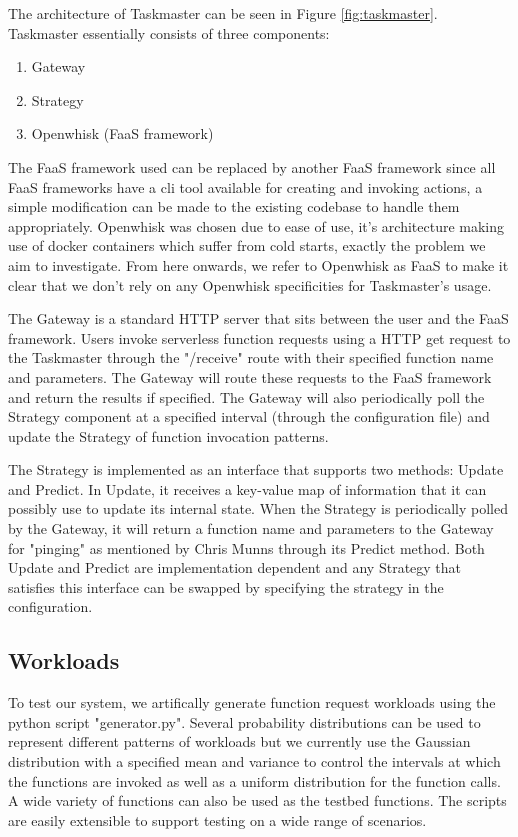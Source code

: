 \documentclass{article}
\begin{document}
The architecture of Taskmaster can be seen in Figure \ref{fig:taskmaster}. Taskmaster essentially consists of three components: 
\begin{enumerate}
    \item Gateway
    \item Strategy
    \item Openwhisk (FaaS framework)
\end{enumerate}

The FaaS framework used can be replaced by another FaaS framework since all FaaS frameworks have a cli tool available for creating and invoking actions, a simple modification can be made to the existing codebase to handle them appropriately. Openwhisk was chosen due to ease of use, it's architecture making use of docker containers which suffer from cold starts, exactly the problem we aim to investigate. From here onwards, we refer to Openwhisk as FaaS to make it clear that we don't rely on any Openwhisk specificities for Taskmaster's usage.

The Gateway is a standard HTTP server that sits between the user and the FaaS framework. Users invoke serverless function requests using a HTTP get request to the Taskmaster through the "/receive" route with their specified function name and parameters. The Gateway will route these requests to the FaaS framework and return the results if specified. The Gateway will also periodically poll the Strategy component at a specified interval (through the configuration file) and update the Strategy of function invocation patterns.

The Strategy is implemented as an interface that supports two methods: Update and Predict. In Update, it receives a key-value map of information that it can possibly use to update its internal state. When the Strategy is periodically polled by the Gateway, it will return a function name and parameters to the Gateway for "pinging" as mentioned by Chris Munns through its Predict method. Both Update and Predict are implementation dependent and any Strategy that satisfies this interface can be swapped by specifying the strategy in the configuration.

\subsection{Workloads}

To test our system, we artifically generate function request workloads using the python script "generator.py". Several probability distributions can be used to represent different patterns of workloads but we currently use the Gaussian distribution with a specified mean and variance to control the intervals at which the functions are invoked as well as a uniform distribution for the function calls. A wide variety of functions can also be used as the testbed functions. The scripts are easily extensible to support testing on a wide range of scenarios.
\end{document}
